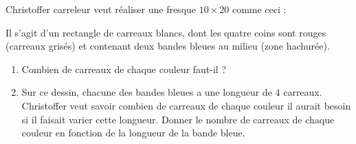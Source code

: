 
\begin{exercice}\label{exo2smath-0110}

Christoffer carreleur veut réaliser une fresque \( 10\times 20\) comme ceci :
\begin{center}
   
\end{center}
Il s'agit d'un rectangle de carreaux blancs, dont les quatre coins sont rouges (carreaux grisés) et contenant deux bandes bleues au milieu (zone hachurée).

\begin{enumerate}
    \item
        Combien de carreaux de chaque couleur faut-il ?
    \item
        Sur ce dessin, chacune des bandes bleues a une longueur de \( 4\) carreaux. Christoffer veut savoir combien de carreaux de chaque couleur il aurait besoin si il faisait varier cette longueur. Donner le nombre de carreaux de chaque couleur en fonction de la longueur de la bande bleue.
\end{enumerate}

\end{exercice}
